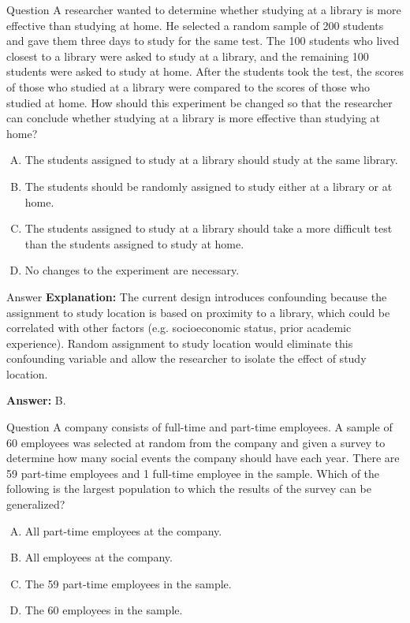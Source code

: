 \documentclass{beamer}
\begin{document}
\begin{frame}{Question}
A researcher wanted to determine whether studying at a library is more effective than studying at home. He selected a random sample of 200 students and gave them three days to study for the same test. The 100 students who lived closest to a library were asked to study at a library, and the remaining 100 students were asked to study at home. After the students took the test, the scores of those who studied at a library were compared to the scores of those who studied at home. How should this experiment be changed so that the researcher can conclude whether studying at a library is more effective than studying at home?

\begin{enumerate}[A.]
    \item The students assigned to study at a library should study at the same library.
    \item The students should be randomly assigned to study either at a library or at home.
    \item The students assigned to study at a library should take a more difficult test than the students assigned to study at home.
    \item No changes to the experiment are necessary.
\end{enumerate}
\end{frame}

\begin{frame}{Answer}
\textbf{Explanation:}  
The current design introduces confounding because the assignment to study location is based on proximity to a library, which could be correlated with other factors (e.g. socioeconomic status, prior academic experience). Random assignment to study location would eliminate this confounding variable and allow the researcher to isolate the effect of study location.

\textbf{Answer:} B.
\end{frame}



\begin{frame}{Question}
A company consists of full-time and part-time employees. A sample of 60 employees was selected at random from the company and given a survey to determine how many social events the company should have each year. There are 59 part-time employees and 1 full-time employee in the sample. Which of the following is the largest population to which the results of the survey can be generalized?

\begin{enumerate}[A.]
    \item All part-time employees at the company.
    \item All employees at the company.
    \item The 59 part-time employees in the sample.
    \item The 60 employees in the sample.
\end{enumerate}
\end{frame}
\end{document}
